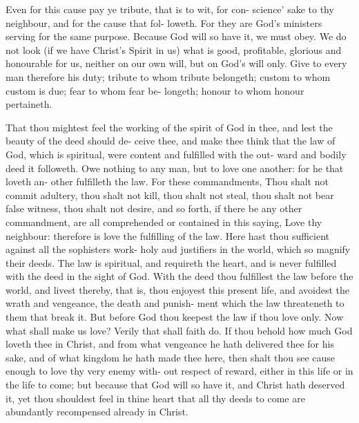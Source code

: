 \documentclass{custom}
\begin{document}
Even for this cause pay ye tribute, that is to wit, for con- 
science' sake to thy neighbour, and for the cause that fol- 
loweth. For they are God's ministers serving for the same 
purpose. Because God will so have it, we must obey. 
We do not look (if we have Christ's Spirit in us) what is 
good, profitable, glorious and honourable for us, neither 
on our own will, but on God's will only. Give to every 
man therefore his duty; tribute to whom tribute belongeth;
custom to whom custom is due; fear to whom fear be- 
longeth; honour to whom honour pertaineth. 

That thou mightest feel the working of the spirit of 
God in thee, and lest the beauty of the deed should de- 
ceive thee, and make thee think that the law of God, 
which is spiritual, were content and fulfilled with the out- 
ward and bodily deed it followeth. Owe nothing to any 
man, but to love one another: for he that loveth an- 
other fulfilleth the law. For these commandments, Thou 
shalt not commit adultery, thou shalt not kill, thou shalt 
not steal, thou shalt not bear false witness, thou shalt not 
desire, and so forth, if there be any other commandment,
are all comprehended or contained in this saying, Love 
thy neighbour: therefore is love the fulfilling of the law. 
Here hast thou sufficient against all the sophisters work- 
holy aud justifiers in the world, which so magnify their 
deeds. The law is spiritual, and requireth the heart, and 
is never fulfilled with the deed in the sight of God. With 
the deed thou fulfillest the law before the world, and 
livest thereby, that is, thou enjoyest this present life, and 
avoidest the wrath and vengeance, the death and punish- 
ment which the law threateneth to them that break it. 
But before God thou keepest the law if thou love only. 
Now what shall make us love? Verily that shall faith 
do. If thou behold how much God loveth thee in Christ, 
and from what vengeance he hath delivered thee for his 
sake, and of what kingdom he hath made thee here, then 
shalt thou see cause enough to love thy very enemy with- 
out respect of reward, either in this life or in the life to 
come; but because that God will so have it, and Christ 
hath deserved it, yet thou shouldest feel in thine heart 
that all thy deeds to come are abundantly recompensed 
already in Christ. 
\end{document}
